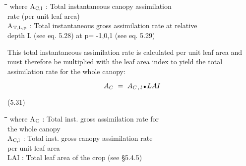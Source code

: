 \documentclass[11pt]{article}
\begin{document}
\nwln
\begin{tabbing}
\hspace{1.27cm}\=\hspace{1.27cm}\=\hspace{1.27cm}\=\hspace{1.27cm}\=%
\hspace{1.27cm}\=\hspace{1.27cm}\=\hspace{1.27cm}\=\hspace{1.27cm}\=%
\hspace{1.27cm}\=\hspace{1.27cm}\=\kill
where\> A$_{{\rm C,l}}$\> : Total instantaneous canopy assimi\-la\-tion \\
\>\>   rate (per unit leaf area)\> \> \> \> \> \> \> \> [kg ha$^{{\rm -1}}$ h$^{{\rm -1}}$]\\
\>A$_{{\rm T,L,p}}$\> : Total instantaneous gross assimilation rate at relative \\
\>\>   depth L (see eq. 5.28) at p= -1,0,1 (see eq. 5.29)\> \> \> \> \> \> \> \> [kg ha$^{{\rm -1}}$ h$^{{\rm -1}}$]
\end{tabbing}

\bigskip
\bigskip
This total instantaneous assimilation rate is calculated per unit leaf area and must
therefore be multiplied with the leaf area index to yield the total assimilation rate for the
whole canopy:

\begin{displaymath}
A _{C} ~=~ A _{C\, ,\, l} \, {\rm \Bullet{0.75ex}}\, LAI
\end{displaymath}

 \bigskip
\strut\hfill (5.31)
\nwln
\begin{tabbing}
\hspace{1.27cm}\=\hspace{1.27cm}\=\hspace{1.27cm}\=\hspace{1.27cm}\=%
\hspace{1.27cm}\=\hspace{1.27cm}\=\hspace{1.27cm}\=\hspace{1.27cm}\=%
\hspace{1.27cm}\=\hspace{1.27cm}\=\kill
where\> A$_{{\rm C}}$\> : Total inst. gross assimila\-tion rate for\\
\>\>   the whole canopy\> \> \> \> \> \> \> \> [kg ha$^{{\rm -1}}$ h$^{{\rm -1}}$]\\
\>A$_{{\rm C,l}}$\> : Total inst. gross canopy assimila\-tion rate\\
\>\>   per unit leaf area\> \> \> \> \> \> \> \> [kg ha$^{{\rm -1}}$ h$^{{\rm -1}}$]\\
\>LAI\> : Total leaf area of the crop (see \S 5.4.5)\> \> \> \> \> \> \> \> [ha ha$^{{\rm -1}}$]
\end{tabbing}
\end{document}
